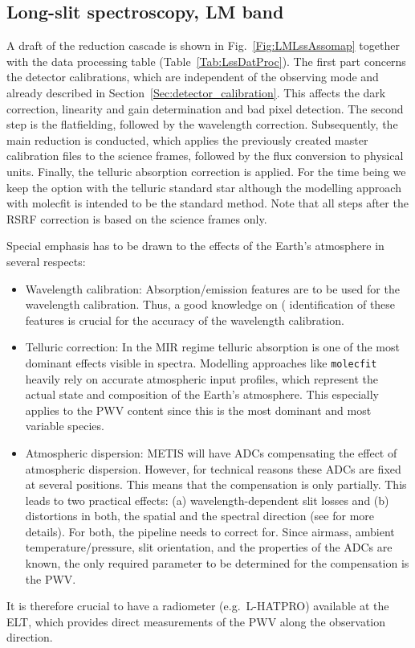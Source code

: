 \subsection{Long-slit spectroscopy, LM band}
\label{ssec:recipes_lss_lm}

A draft of the reduction cascade is shown in
Fig.~\ref{Fig:LMLssAssomap} together with the data processing table
(Table~\ref{Tab:LssDatProc}). The first part concerns the detector
calibrations, which are independent of the observing mode and already
described in Section~\ref{Sec:detector_calibration}. This affects the
dark correction, linearity and gain determination and bad pixel
detection. The second step is the flatfielding, followed by the wavelength
correction. Subsequently, the main reduction is conducted, which applies
the previously created master calibration files to the science frames,
followed by the flux conversion to physical units. Finally, the telluric 
absorption correction is applied. For the time being we keep the option with the telluric standard star although the modelling approach with molecfit is intended to be the standard method. Note that all steps after the \ac{RSRF} correction is based on the science frames only.

Special emphasis has to be drawn to the effects of the Earth's
atmosphere in several respects:
\begin{itemize}
\item Wavelength calibration: Absorption/emission features are to be
  used for the wavelength calibration. Thus, a good knowledge on (
  identification of these features is crucial for the accuracy of the
  wavelength calibration.
\item Telluric correction: In the MIR regime telluric absorption is
  one of the most dominant effects visible in spectra. Modelling
  approaches like \texttt{molecfit} heavily rely on accurate
  atmospheric input profiles, which represent the actual state and
  composition of the Earth's atmosphere. This especially applies to
  the \ac{PWV} content since this is the most
  dominant and most variable species.
\item Atmospheric dispersion: \ac{METIS} will have \ac{ADC}s compensating the
  effect of atmospheric dispersion. However, for technical reasons
  these ADCs are fixed at several positions. This means that the
  compensation is only partially. This leads to two practical effects:
  (a) wavelength-dependent slit losses and (b) distortions in both,
  the spatial and the spectral direction (see \cite{METIS-ADC_study}
  for more details). For both, the pipeline needs to correct
  for. Since airmass, ambient temperature/pressure, slit orientation,
  and the properties of the \ac{ADC}s are known, the only required
  parameter to be determined for the compensation is the \ac{PWV}.
\end{itemize}
It is therefore crucial to have a radiometer (e.g.\ L-HATPRO)
available at the \ac{ELT}, which provides direct measurements of the \ac{PWV}
along the observation direction.

